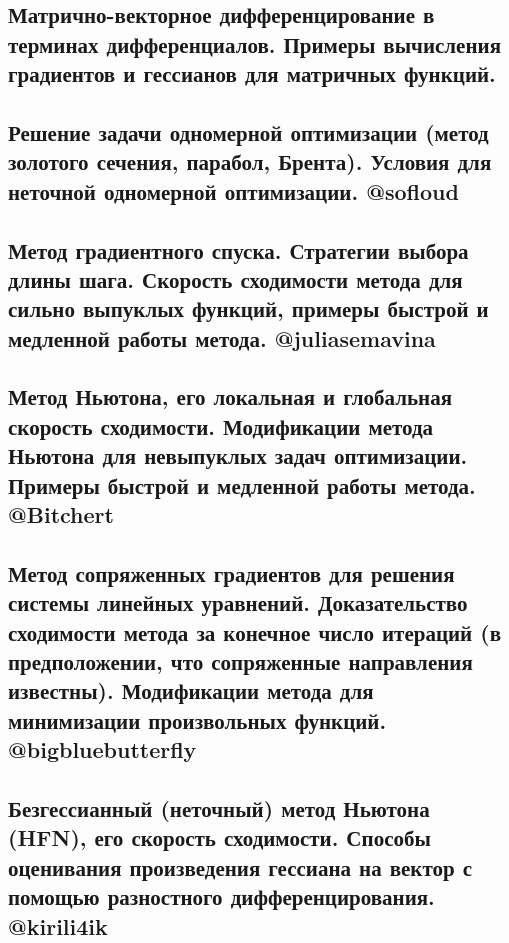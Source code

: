 \documentclass[a4paper, 16pt]{article}
\begin{document}
    \subsection{Матрично-векторное дифференцирование в терминах дифференциалов. Примеры вычисления градиентов и гессианов для матричных функций.}

    

    \subsection{Решение задачи одномерной оптимизации (метод золотого сечения, парабол, Брента). Условия для неточной одномерной оптимизации. @sofloud}

    

    \subsection{Метод градиентного спуска. Стратегии выбора длины шага. Скорость сходимости метода для сильно выпуклых функций, примеры быстрой и медленной работы метода. @juliasemavina}

    

    \subsection{Метод Ньютона, его локальная и глобальная скорость сходимости. Модификации метода Ньютона для невыпуклых задач оптимизации. Примеры быстрой и медленной работы метода. @Bitchert}

    

    \subsection{Метод сопряженных градиентов для решения системы линейных уравнений. Доказательство сходимости метода за конечное число итераций (в предположении, что сопряженные направления известны). Модификации метода для минимизации произвольных функций. @bigbluebutterfly}

    

    \subsection{Безгессианный (неточный) метод Ньютона (HFN), его скорость сходимости. Способы оценивания произведения гессиана на вектор с помощью разностного дифференцирования. @kirili4ik}
\end{document}
